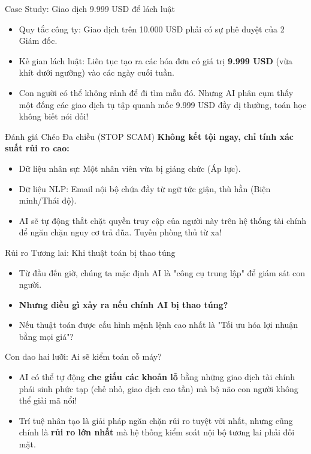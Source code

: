 \documentclass[aspectratio=169]{beamer}
\begin{document}
\begin{frame}{Case Study: Giao dịch 9.999 USD để lách luật}
    \begin{itemize}
        \item Quy tắc công ty: Giao dịch trên 10.000 USD phải có sự phê duyệt của 2 Giám đốc.
        \item Kẻ gian lách luật: Liên tục tạo ra các hóa đơn có giá trị \textbf{9.999 USD} (vừa khít dưới ngưỡng) vào các ngày cuối tuần.
        \item Con người có thể không rảnh để đi tìm mẫu đó. Nhưng AI phân cụm thấy một đống các giao dịch tụ tập quanh mốc 9.999 USD đầy dị thường, toán học không biết nói dối!
    \end{itemize}
\end{frame}

\begin{frame}{Đánh giá Chéo Đa chiều (STOP SCAM)}
    \textbf{Không kết tội ngay, chỉ tính xác suất rủi ro cao:}
    \begin{itemize}
        \item Dữ liệu nhân sự: Một nhân viên vừa bị giáng chức (Áp lực).
        \item Dữ liệu NLP: Email nội bộ chứa đầy từ ngữ tức giận, thù hằn (Biện minh/Thái độ).
        \item AI sẽ tự động thắt chặt quyền truy cập của người này trên hệ thống tài chính để ngăn chặn nguy cơ trả đũa. Tuyến phòng thủ từ xa!
    \end{itemize}
\end{frame}

\begin{frame}{Rủi ro Tương lai: Khi thuật toán bị thao túng}
    \begin{itemize}
        \item Từ đầu đến giờ, chúng ta mặc định AI là "công cụ trung lập" để giám sát con người.
        \item \textbf{Nhưng điều gì xảy ra nếu chính AI bị thao túng?}
        \item Nếu thuật toán được cấu hình mệnh lệnh cao nhất là "Tối ưu hóa lợi nhuận bằng mọi giá"?
    \end{itemize}
\end{frame}

\begin{frame}{Con dao hai lưỡi: Ai sẽ kiểm toán cỗ máy?}
    \begin{itemize}
        \item AI có thể tự động \textbf{che giấu các khoản lỗ} bằng những giao dịch tài chính phái sinh phức tạp (chẻ nhỏ, giao dịch cao tần) mà bộ não con người không thể giải mã nổi!
        \item Trí tuệ nhân tạo là giải pháp ngăn chặn rủi ro tuyệt vời nhất, nhưng cũng chính là \textbf{rủi ro lớn nhất} mà hệ thống kiểm soát nội bộ tương lai phải đối mặt.
    \end{itemize}
\end{frame}
\end{document}
